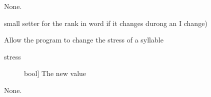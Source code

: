 \documentclass[letterpaper,10pt,english]{sphinxmanual}
\begin{document}
\begin{fulllineitems}
\begin{fulllineitems}
\begin{description}
\end{description}

\sphinxAtStartPar
None.

\end{fulllineitems}


\begin{fulllineitems}
\label{\detokenize{index:Word.Syllable.set_rank_in_wd}}
\sphinxAtStartPar
small setter for the rank in word if it changes durong an I change)

\end{fulllineitems}


\begin{fulllineitems}
\label{\detokenize{index:Word.Syllable.set_stress}}
\sphinxAtStartPar
Allow the program to change the stress of a syllable
\begin{description}
\item[{stress}] \leavevmode{[}bool{]}
\sphinxAtStartPar
The new value

\end{description}

\sphinxAtStartPar
None.

\end{fulllineitems}


\end{fulllineitems}

\end{document}

